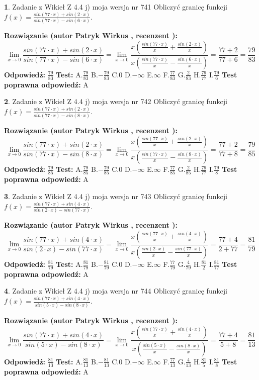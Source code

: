 \documentclass[12pt, a4paper]{article}
\theoremstyle{definition} %
\newtheorem{zad}{}
\newcommand{\zadStart}[1]{\begin{zad}#1\newline}
\newcommand{\zadStop}{\end{zad}}
\newcommand{\rozwStart}[2]{\noindent \textbf{Rozwiązanie (autor #1 , recenzent #2): }\newline}
\newcommand{\rozwStop}{\newline}
\newcommand{\odpStart}{\noindent \textbf{Odpowiedź:}\newline}
\newcommand{\odpStop}{\newline}
\newcommand{\testStart}{\noindent \textbf{Test:}\newline}
\newcommand{\testStop}{\newline}
\newcommand{\kluczStart}{\noindent \textbf{Test poprawna odpowiedź:}\newline}
\newcommand{\kluczStop}{\newline}
\begin{document}
\zadStart{Zadanie z Wikieł Z 4.4 j) moja wersja nr 741}
Obliczyć granicę funkcji $f(x)=\frac{sin(77\cdot x) +sin(2\cdot x)}{sin(77\cdot x) -sin(6\cdot x)}$.
\zadStop
\rozwStart{Patryk Wirkus}{}
$$\lim\limits_{x\to 0}\frac{sin(77\cdot x) +sin(2\cdot x)}{sin(77\cdot x) -sin(6\cdot x)}=\lim\limits_{x\to 0}\frac{x(\frac{sin(77\cdot x)}{x}+\frac{sin(2\cdot x)}{x})}{x(\frac{sin(77\cdot x)}{x}-\frac{sin(6\cdot x)}{x})}=\frac{77+2}{77+6} = \frac{79}{83}$$
\rozwStop
\odpStart
$\frac{79}{83}$
\odpStop
\testStart
A.$\frac{79}{83}$
B.$-\frac{79}{83}$
C.$0$
D.$-\infty$
E.$\infty$
F.$\frac{77}{83}$
G.$\frac{2}{83}$
H.$\frac{79}{77}$
I.$\frac{79}{6}$
\testStop
\kluczStart
A
\kluczStop



\zadStart{Zadanie z Wikieł Z 4.4 j) moja wersja nr 742}
Obliczyć granicę funkcji $f(x)=\frac{sin(77\cdot x) +sin(2\cdot x)}{sin(77\cdot x) -sin(8\cdot x)}$.
\zadStop
\rozwStart{Patryk Wirkus}{}
$$\lim\limits_{x\to 0}\frac{sin(77\cdot x) +sin(2\cdot x)}{sin(77\cdot x) -sin(8\cdot x)}=\lim\limits_{x\to 0}\frac{x(\frac{sin(77\cdot x)}{x}+\frac{sin(2\cdot x)}{x})}{x(\frac{sin(77\cdot x)}{x}-\frac{sin(8\cdot x)}{x})}=\frac{77+2}{77+8} = \frac{79}{85}$$
\rozwStop
\odpStart
$\frac{79}{85}$
\odpStop
\testStart
A.$\frac{79}{85}$
B.$-\frac{79}{85}$
C.$0$
D.$-\infty$
E.$\infty$
F.$\frac{77}{85}$
G.$\frac{2}{85}$
H.$\frac{79}{77}$
I.$\frac{79}{8}$
\testStop
\kluczStart
A
\kluczStop



\zadStart{Zadanie z Wikieł Z 4.4 j) moja wersja nr 743}
Obliczyć granicę funkcji $f(x)=\frac{sin(77\cdot x) +sin(4\cdot x)}{sin(2\cdot x) -sin(77\cdot x)}$.
\zadStop
\rozwStart{Patryk Wirkus}{}
$$\lim\limits_{x\to 0}\frac{sin(77\cdot x) +sin(4\cdot x)}{sin(2\cdot x) -sin(77\cdot x)}=\lim\limits_{x\to 0}\frac{x(\frac{sin(77\cdot x)}{x}+\frac{sin(4\cdot x)}{x})}{x(\frac{sin(2\cdot x)}{x}-\frac{sin(77\cdot x)}{x})}=\frac{77+4}{2+77} = \frac{81}{79}$$
\rozwStop
\odpStart
$\frac{81}{79}$
\odpStop
\testStart
A.$\frac{81}{79}$
B.$-\frac{81}{79}$
C.$0$
D.$-\infty$
E.$\infty$
F.$\frac{77}{79}$
G.$\frac{4}{79}$
H.$\frac{81}{2}$
I.$\frac{81}{77}$
\testStop
\kluczStart
A
\kluczStop



\zadStart{Zadanie z Wikieł Z 4.4 j) moja wersja nr 744}
Obliczyć granicę funkcji $f(x)=\frac{sin(77\cdot x) +sin(4\cdot x)}{sin(5\cdot x) -sin(8\cdot x)}$.
\zadStop
\rozwStart{Patryk Wirkus}{}
$$\lim\limits_{x\to 0}\frac{sin(77\cdot x) +sin(4\cdot x)}{sin(5\cdot x) -sin(8\cdot x)}=\lim\limits_{x\to 0}\frac{x(\frac{sin(77\cdot x)}{x}+\frac{sin(4\cdot x)}{x})}{x(\frac{sin(5\cdot x)}{x}-\frac{sin(8\cdot x)}{x})}=\frac{77+4}{5+8} = \frac{81}{13}$$
\rozwStop
\odpStart
$\frac{81}{13}$
\odpStop
\testStart
A.$\frac{81}{13}$
B.$-\frac{81}{13}$
C.$0$
D.$-\infty$
E.$\infty$
F.$\frac{77}{13}$
G.$\frac{4}{13}$
H.$\frac{81}{5}$
I.$\frac{81}{8}$
\testStop
\kluczStart
A
\kluczStop
\end{document}
